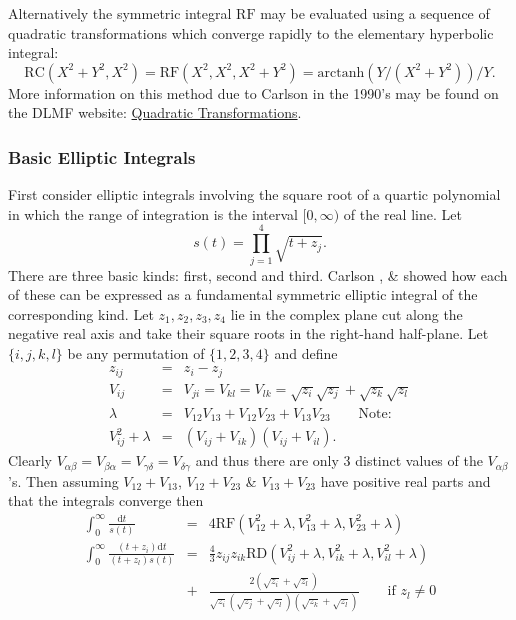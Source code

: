 Alternatively the symmetric integral $\mathrm{RF}$ may be evaluated
using a sequence of quadratic transformations
which converge rapidly to the elementary hyperbolic integral:
\[\mathrm{RC}(X^2+Y^2,X^2) = \mathrm{RF}(X^2,X^2,X^2+Y^2) = \mathrm{arctanh}
(Y/(X^2+Y^2))/Y.\]
More information on this method due to Carlson in the 1990's
may be found on the DLMF website:
\href{https://dlmf.nist.gov/19.36#ii}{Quadratic Transformations}.

\subsubsection{Basic Elliptic Integrals}
First consider elliptic integrals involving the square root of a
quartic polynomial in which the range of integration is the interval
$[0,\infty)$ of the real line. Let
\[s(t)=\prod_{j=1}^4\sqrt{t+z_j}.\]
There are three basic kinds: first, second and third. Carlson \cite{Carlson:88},
\cite{Carlson:99} \& \cite{CarlsonFitzsimmons} showed how each of these can be
expressed as a fundamental symmetric elliptic integral of the corresponding
kind. Let $z_1, z_2, z_3, z_4$ lie in the complex plane cut along the negative
real axis and take their square roots in the right-hand half-plane.
Let $\{i,j,k,l\}$ be any permutation  of $\{1,2,3,4\}$ and define
\begin{eqnarray*}
  z_{ij}&=&z_i-z_j\\
  V_{ij}&=&V_{ji}=V_{kl}=V_{lk}= \sqrt{z_i}\sqrt{z_j}+\sqrt{z_k}\sqrt{z_l}\\
  \lambda&=&V_{12}V_{13}+V_{12}V_{23}+V_{13}V_{23}\qquad\mbox{Note:}\\
  V_{ij}^2 +\lambda &=& (V_{ij}+V_{ik})(V_{ij}+V_{il}).
\end{eqnarray*}
Clearly $V_{\alpha\beta}=V_{\beta\alpha}=V_{\gamma\delta}=V_{\delta\gamma}$ and thus there
are only 3 distinct values of the $V_{\alpha\beta}$'s. Then assuming
$V_{12}+V_{13}$, $V_{12}+V_{23}$ \& $V_{13}+V_{23}$ have positive real
parts and that the integrals converge then
\begin{eqnarray*}
\int_0^\infty \frac{\mathrm{d}t}{s(t)} &=& 4\mathrm{RF}(V_{12}^2+\lambda,
V_{13}^2+\lambda, V_{23}^2+\lambda)\\
\int_0^\infty \frac{(t+z_i)\mathrm{d}t}{(t+z_l)s(t)} &=&
\frac{4}{3}z_{ij}z_{ik}\mathrm{RD}(V_{ij}^2+\lambda, V_{ik}^2+\lambda, V_{il}^2+\lambda) \\
&+&\frac{2(\sqrt{z_i}+\sqrt{z_l})}{\sqrt{z_i}(\sqrt{z_j}+\sqrt{z_l})(\sqrt{z_k}+\sqrt{z_l})}\qquad
\mbox{if }z_l\neq 0
\end{eqnarray*}

